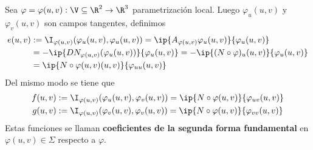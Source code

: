 \documentclass{article}
\begin{document}
\noindent Sea $\varphi=\varphi(u,v):\V\subseteq\R^{2}\to\R^{3}$ parametrización local. Luego
$\varphi_{u}(u,v)$ y $\varphi_{v}(u,v)$ son campos tangentes, definimos
\begin{align*}
    e(u,v) &:= \I_{\varphi(u,v)}(\varphi_{u}(u,v),\varphi_{u}(u,v))=
    \ip{A_{\varphi(u,v)}\varphi_{u}(u,v)}{\varphi_{u}(u,v)} \\
    &= -\ip{DN_{\varphi(u,v)}(\varphi_{u}(u,v))}{\varphi_{u}(u,v)}=
    -\ip{(N\circ\varphi)_{u}(u,v)}{\varphi_{u}(u,v)} \\
    &= \ip{N\circ\varphi(u,v)(u,v)}{\varphi_{uu}(u,v)}
\end{align*}
Del mismo modo se tiene que
\begin{align*}
    f(u,v) &:= \I_{\varphi(u,v)}(\varphi_{u}(u,v),\varphi_{v}(u,v))=\ip{N\circ\varphi(u,v)}
    {\varphi_{uv}(u,v)} \\
    g(u,v) &:= \I_{\varphi(u,v)}(\varphi_{v}(u,v),\varphi_{v}(u,v))=\ip{N\circ\varphi(u,v)}
    {\varphi_{vv}(u,v)}
\end{align*}
Estas funciones se llaman \textbf{coeficientes de la segunda forma fundamental} en 
$\varphi(u,v)\in\Sigma$ respecto a $\varphi$.
\end{document}

